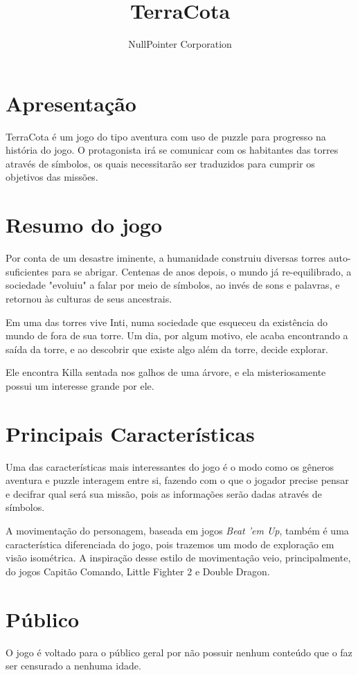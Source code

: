 \documentclass[11pt]{article}
\begin{document}
\title{TerraCota}
\author{NullPointer Corporation}
\date{}
\maketitle

\newpage

\tableofcontents
\newpage
\section{Apresentação}
TerraCota é um jogo do tipo aventura com uso de puzzle para progresso na história do jogo.  O protagonista irá se comunicar com os habitantes das torres através de símbolos, os quais necessitarão ser traduzidos para cumprir os objetivos das missões.

\section{Resumo do jogo}
Por conta de um desastre iminente, a humanidade construiu diversas torres auto-suficientes para se abrigar.
Centenas de anos depois, o mundo já re-equilibrado, a sociedade "evoluiu" a falar por meio de símbolos, ao invés de sons e palavras, e retornou às culturas de seus ancestrais.

Em uma das torres vive Inti, numa sociedade que esqueceu da existência do mundo de fora de sua torre.
Um dia, por algum motivo, ele acaba encontrando a saída da torre, e ao descobrir que existe algo além da torre, decide explorar.

Ele encontra Killa sentada nos galhos de uma árvore, e ela misteriosamente possui um interesse grande por ele.

\section{Principais Características}
Uma das características mais interessantes do jogo é o modo como os gêneros aventura e puzzle interagem entre si, fazendo com o que o jogador precise pensar e decifrar qual será sua missão, pois as informações serão dadas através de símbolos.

A movimentação do personagem, baseada em jogos \textit{Beat 'em Up}, também é uma característica diferenciada do jogo, pois trazemos um modo de exploração em visão isométrica. A inspiração desse estilo de movimentação veio, principalmente, do jogos Capitão Comando, Little Fighter 2 e Double Dragon.

\section{Público}
O jogo é voltado para o público geral por não possuir nenhum conteúdo que o faz ser censurado a nenhuma idade.
\end{document}
